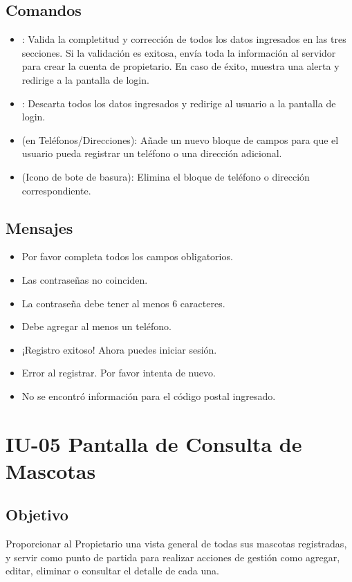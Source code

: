 \subsection{Comandos}
\begin{itemize}
    \item {}: Valida la completitud y corrección de todos los datos ingresados en las tres secciones. Si la validación es exitosa, envía toda la información al servidor para crear la cuenta de propietario. En caso de éxito, muestra una alerta y redirige a la pantalla de login.
    \item {}: Descarta todos los datos ingresados y redirige al usuario a la pantalla de login.
    \item {} (en Teléfonos/Direcciones): Añade un nuevo bloque de campos para que el usuario pueda registrar un teléfono o una dirección adicional.
    \item {} (Icono de bote de basura): Elimina el bloque de teléfono o dirección correspondiente.
\end{itemize}

\subsection{Mensajes}
\begin{itemize}
    \item Por favor completa todos los campos obligatorios.
    \item Las contraseñas no coinciden.
    \item La contraseña debe tener al menos 6 caracteres.
    \item Debe agregar al menos un teléfono.
    \item ¡Registro exitoso! Ahora puedes iniciar sesión.
    \item Error al registrar. Por favor intenta de nuevo.
    \item No se encontró información para el código postal ingresado.
\end{itemize}

\section{IU-05 Pantalla de Consulta de Mascotas}

\subsection{Objetivo}
    Proporcionar al Propietario una vista general de todas sus mascotas registradas, y servir como punto de partida para realizar acciones de gestión como agregar, editar, eliminar o consultar el detalle de cada una.

